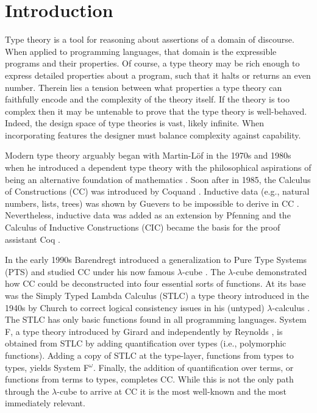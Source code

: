 \chapter{Introduction}



Type theory is a tool for reasoning about assertions of a domain of discourse.
When applied to programming languages, that domain is the expressible programs and their properties.
Of course, a type theory may be rich enough to express detailed properties about a program, such that it halts or returns an even number.
Therein lies a tension between what properties a type theory can faithfully encode and the complexity of the theory itself.
If the theory is too complex then it may be untenable to prove that the type theory is well-behaved.
Indeed, the design space of type theories is vast, likely infinite.
When incorporating features the designer must balance complexity against capability.

Modern type theory arguably began with Martin-L\"{o}f in the 1970s and 1980s when he introduced a dependent type theory with the philosophical aspirations of being an alternative foundation of mathematics \cite{lof1975,lof1984}.
Soon after in 1985, the Calculus of Constructions (CC) was introduced by Coquand \cite{coquand1985,coquand1986}.
Inductive data (e.g., natural numbers, lists, trees) was shown by Guevers to be impossible to derive in CC \cite{geuvers2001_noind}.
Nevertheless, inductive data was added as an extension by Pfenning \cite{pfenning1989} and the Calculus of Inductive Constructions (CIC) became the basis for the proof assistant Coq \cite{paulin-mohring1993}.

In the early 1990s Barendregt introduced a generalization to Pure Type Systems (PTS) and studied CC under his now famous $\lambda$-cube \cite{barendregt1990_cube,barendregt1991_pts}.
The $\lambda$-cube demonstrated how CC could be deconstructed into four essential sorts of functions.
At its base was the Simply Typed Lambda Calculus (STLC) a type theory introduced in the 1940s by Church to correct logical consistency issues in his (untyped) $\lambda$-calculus \cite{church1940_stlc}.
The STLC has only basic functions found in all programming languages.
System F, a type theory introduced by Girard \cite{girard1972,girard1989} and independently by Reynolds \cite{reynolds1974_systemf}, is obtained from STLC by adding quantification over types (i.e., polymorphic functions).
Adding a copy of STLC at the type-layer, functions from types to types, yields System F$^\omega$.
Finally, the addition of quantification over terms, or functions from terms to types, completes CC.
While this is not the only path through the $\lambda$-cube to arrive at CC it is the most well-known and the most immediately relevant.

